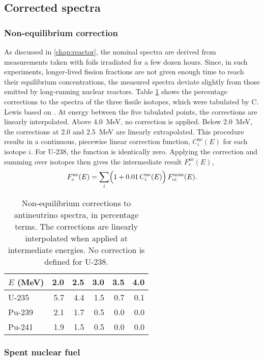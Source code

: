 \documentclass[../thesis.tex]{subfiles}
\begin{document}
\subsection{Corrected spectra}
\label{sec:corrspectra}

\subsubsection{Non-equilibrium correction}
\label{sec:noneqcorrspectra}

As discussed in \ref{chap:reactor}, the nominal spectra are derived from measurements taken with foils irradiated for a few dozen hours. Since, in such experiments, longer-lived fission fractions are not given enough time to reach their equilibrium concentrations, the measured spectra deviate slightly from those emitted by long-running nuclear reactors. Table \ref{tab:noneqcorr} shows the percentage corrections to the spectra of the three fissile isotopes, which were tabulated by C. Lewis \cite{Lewis} based on \cite{Mueller}. At energy between the five tabulated points, the corrections are linearly interpolated. Above 4.0~MeV, no correction is applied. Below 2.0~MeV, the corrections at 2.0 and 2.5~MeV are linearly extrapolated. This procedure results in a continuous, piecewise linear correction function, $C^\mathrm{ne}_i(E)$ for each isotope $i$. For U-238, the function is identically zero. Applying the correction and summing over isotopes then gives the intermediate result $F^\mathrm{ne}_c(E)$,
\[ F^\mathrm{ne}_c(E) = \sum_i \Bigl(1 + 0.01\, C^\mathrm{ne}_i(E)\Bigr)\, F^\mathrm{nom}_{ci}(E). \]

\begin{table}
  \centering
  \begin{tabular}{lrrrrr}
    \toprule
    $E$ (MeV) & 2.0 & 2.5 & 3.0 & 3.5 & 4.0 \\
    \midrule
    U-235 & 5.7 & 4.4 & 1.5 & 0.7 & 0.1 \\
    Pu-239 & 2.1 & 1.7 & 0.5 & 0.0 & 0.0 \\
    Pu-241 & 1.9 & 1.5 & 0.5 & 0.0 & 0.0 \\
    \bottomrule
  \end{tabular}
  \caption{Non-equilibrium corrections to antineutrino spectra, in percentage terms. The corrections are linearly interpolated when applied at intermediate energies. No correction is defined for U-238.}
  \label{tab:noneqcorr}
\end{table}

\subsubsection{Spent nuclear fuel}
\label{sec:snfcorrspectra}
\end{document}
